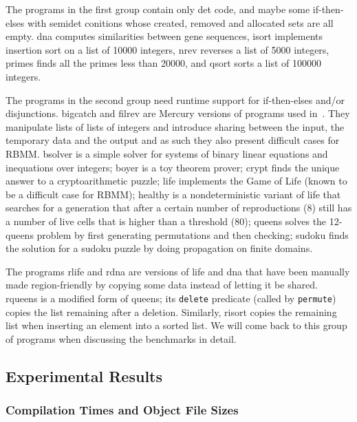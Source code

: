\documentclass{tlp}
\newcommand{\bench}[1]{{#1}}
\newcommand{\code}[1]{{\tt#1}}
\begin{document}
The programs in the first group contain only det code,
and maybe some if-then-elses with semidet conitions
whose created, removed and allocated sets are all empty.
\bench{dna} computes similarities between gene sequences,
\bench{isort} implements insertion sort on a list of 10000 integers,
\bench{nrev} reverses a list of 5000 integers,
\bench{primes} finds all the primes less than 20000, and
\bench{qsort} sorts a list of 100000 integers.

The programs in the second group need runtime support
for if-then-elses and/or disjunctions.
\bench{bigcatch} and \bench{filrev} are
Mercury versions of programs used in~\cite{Aspinall08usageaspect}.
They manipulate lists of lists of integers
and introduce sharing between the input, the temporary data and the output
and as such they also present difficult cases for RBMM.
\bench{bsolver} is a simple solver for systems of
binary linear equations and inequations over integers;
\bench{boyer} is a toy theorem prover;
\bench{crypt} finds the unique answer to a cryptoarithmetic puzzle;
\bench{life} implements the Game of Life
(known to be a difficult case for RBMM);
\bench{healthy} is a nondeterministic variant of \bench{life}
that searches for a generation that after a certain number of reproductions (8)
still has a number of live cells that is higher than a threshold (80);
\bench{queens} solves the 12-queens problem
by first generating permutations and then checking;
\bench{sudoku} finds the solution for a sudoku puzzle
by doing propagation on finite domains.

The programs \bench{rlife} and \bench{rdna}
are versions of \bench{life} and \bench{dna}
that have been manually made region-friendly
by copying some data instead of letting it be shared.
\bench{rqueens} is a modified form of \bench{queens};
its \code{delete} predicate (called by \code{permute})
copies the list remaining after a deletion.
Similarly, \bench{risort} copies the remaining list
when inserting an element into a sorted list.
We will come back to this group of programs
when discussing the benchmarks in detail.

\subsection{Experimental Results}

\subsubsection{Compilation Times and Object File Sizes}
\end{document}
